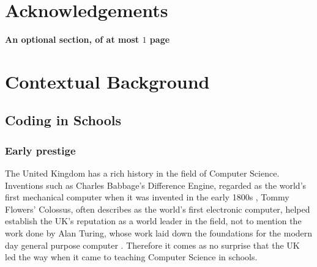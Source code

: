 \documentclass[ %
                    author={Jonathan Rankin},
                supervisor={Dr. David May, Dr. Ian Holyer},
                    degree={MEng},
                     title={CodeTouch},
                  subtitle={A Revolutionary Way To Program Real Code On Touch Screen Devices},
                      type={enterprise},
                      year={2015 } ]{dissertation}
\begin{document}

\chapter*{Acknowledgements}

{\bf An optional section, of at most $1$ page}
\vspace{1cm} 

\noindent



%

\mainmatter


\chapter{Contextual Background}
\label{chap:context}

\section{Coding in Schools}

\subsection{Early prestige}

The United Kingdom has a rich history in the field of Computer Science. Inventions such as Charles Babbage's Difference Engine, regarded as the world's first mechanical computer when it was invented in the early 1800s \cite{Swade}, Tommy Flowers' Colossus, often describes as the world's first electronic computer, \cite{mackintosh2008first} helped establish the UK's reputation as a world leader in the field, not to mention the work done by Alan Turing, whose work laid down the foundations for the modern day general purpose computer \cite{Newman253}. Therefore it comes as no surprise that the UK led the way when it came to teaching Computer Science in schools. 
\end{document}
